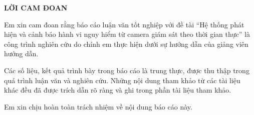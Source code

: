 
\begin{center}
    \textbf{\MakeUppercase{LỜI CAM ĐOAN}}
\end{center}

Em xin cam đoan rằng báo cáo luận văn tốt nghiệp với đề tài “Hệ thống phát hiện và cảnh báo hành vi nguy hiểm từ camera giám sát theo thời gian thực” là công trình nghiên cứu do chính em thực hiện dưới sự hướng dẫn của giảng viên hướng dẫn.

Các số liệu, kết quả trình bày trong báo cáo là trung thực, được thu thập trong quá trình luận văn và nghiên cứu. Những nội dung tham khảo từ các tài liệu khác đều đã được trích dẫn rõ ràng và ghi trong phần tài liệu tham khảo.

Em xin chịu hoàn toàn trách nhiệm về nội dung báo cáo này.

\clearpage

